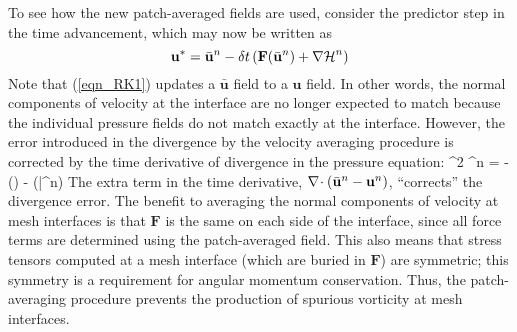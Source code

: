 To see how the new patch-averaged fields are used, consider the predictor step in the time advancement,
which may now be written as
\begin{equation}
\label{eqn_RK1}
\mathbf{u}^* = \bar{\mathbf{u}}^n - \delta t \left( \mathbf{F}(\bar{\mathbf{u}}^n) + {\nabla{\cal H}}^n \right)
\end{equation}
Note that (\ref{eqn_RK1}) updates a $\bar{\mathbf{u}}$ field to a $\mathbf{u}$ field. In other words, the normal components
of velocity at the interface are no longer expected to match because the individual pressure fields do not match exactly
at the interface. However, the error introduced in the divergence by the velocity averaging procedure is corrected by the time
derivative of divergence in the pressure equation:
\be
\label{eqn_poisson_stg1}
\nabla^2 {\cH}^n = -\left(\right) -
  (\bar{}^n)
\ee
The extra term in the time derivative, $\nabla\!\cdot (\bar{{\bf u}}^n - {\bf u}^n)$, ``corrects'' the divergence error.
The benefit to averaging the normal components of velocity at mesh interfaces is that $\mathbf{F}$ is the same on each side of the interface,
since all force terms are determined using the patch-averaged field.
This also means that stress tensors computed at a mesh interface (which are buried in $\mathbf{F}$) are symmetric;
this symmetry is a requirement for angular momentum conservation.  Thus, the patch-averaging procedure prevents the
production of spurious vorticity at mesh interfaces.

